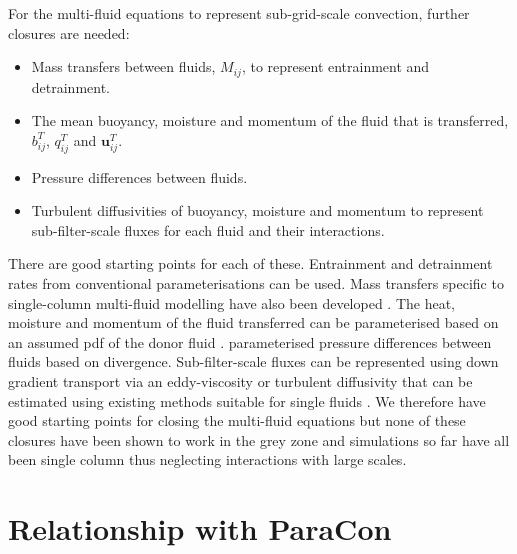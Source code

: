 \documentclass[11pt,a4paper]{article}
\begin{document}
For the multi-fluid equations to represent sub-grid-scale convection, further closures are needed:
\begin{itemize}
\item Mass transfers between fluids, $M_{ij}$, to represent entrainment and detrainment.
\item The mean buoyancy, moisture and momentum of the fluid that is transferred, $b_{ij}^T$, $q_{ij}^T$ and $\mathbf{u}_{ij}^T$. 
\item Pressure differences between fluids.
\item Turbulent diffusivities of buoyancy, moisture and momentum to represent sub-filter-scale fluxes for each fluid and their interactions. 
\end{itemize}
There are good starting points for each of these. Entrainment and detrainment rates from conventional parameterisations can be used. Mass transfers specific to single-column multi-fluid modelling have also been developed \cite[]{WMS20,TEB19}. The heat, moisture and momentum of the fluid transferred can be parameterised based on an assumed pdf of the donor fluid \cite[see][and the description in section \ref{sec:tools}]{McIn20}. \cite{WMS20} parameterised pressure differences between fluids based on divergence. Sub-filter-scale fluxes can be represented using down gradient transport via an eddy-viscosity or turbulent diffusivity that can be estimated using existing methods suitable for single fluids \cite[eg.][]{mellor1982}. We therefore have good starting points for closing the multi-fluid equations but none of these closures have been shown to work in the grey zone and simulations so far have all been single column thus neglecting interactions with large scales. 

\section{Relationship with ParaCon}
\end{document}
